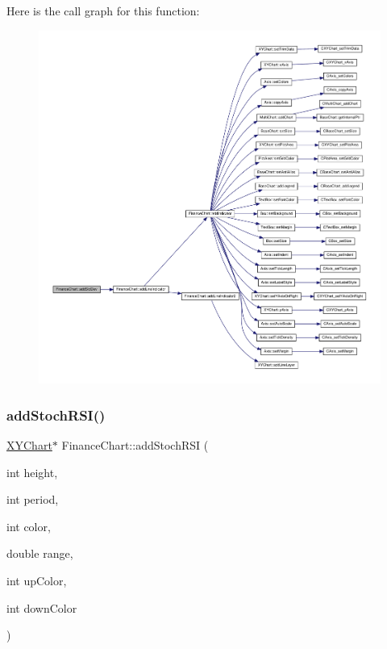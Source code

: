 Here is the call graph for this function\+:
\nopagebreak
\begin{figure}[H]
\begin{center}
\leavevmode
\includegraphics[width=350pt]{class_finance_chart_abee75e01f567badfa4da74c92a60d00c_cgraph}
\end{center}
\end{figure}
\mbox{\label{class_finance_chart_a8c44b07a3a6dcf2e3feb09960dfa9770}} 
\subsubsection{\texorpdfstring{add\+Stoch\+R\+S\+I()}{addStochRSI()}}
{\footnotesize\ttfamily \hyperlink{class_x_y_chart}{X\+Y\+Chart}$\ast$ Finance\+Chart\+::add\+Stoch\+R\+SI (\begin{DoxyParamCaption}\item[{int}]{height,  }\item[{int}]{period,  }\item[{int}]{color,  }\item[{double}]{range,  }\item[{int}]{up\+Color,  }\item[{int}]{down\+Color }\end{DoxyParamCaption})\hspace{0.3cm}{\ttfamily [inline]}}



